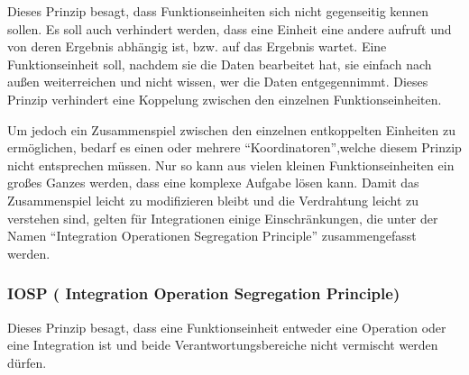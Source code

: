 Dieses Prinzip besagt, dass Funktionseinheiten sich nicht gegenseitig kennen sollen.
Es soll auch verhindert werden, dass eine Einheit eine andere aufruft und von deren Ergebnis
abhängig ist, bzw. auf das Ergebnis wartet.
Eine Funktionseinheit soll, nachdem sie die Daten bearbeitet hat, sie einfach nach
außen weiterreichen und nicht wissen, wer die Daten entgegennimmt.
Dieses Prinzip verhindert eine Koppelung zwischen den einzelnen Funktionseinheiten.

Um jedoch ein Zusammenspiel zwischen den einzelnen entkoppelten Einheiten zu ermöglichen, bedarf es einen oder
mehrere \enquote{Koordinatoren},welche diesem Prinzip nicht entsprechen müssen.
Nur so kann aus vielen kleinen Funktionseinheiten ein großes Ganzes werden, dass eine komplexe Aufgabe lösen kann.
Damit das Zusammenspiel leicht zu modifizieren bleibt und die Verdrahtung
leicht zu verstehen sind, gelten für Integrationen einige Einschränkungen, die
unter der Namen \enquote{Integration Operationen Segregation Principle} zusammengefasst
werden.



\subsubsection{IOSP ( Integration Operation Segregation Principle)}


Dieses Prinzip besagt, dass eine Funktionseinheit entweder eine Operation oder eine Integration ist und beide
Verantwortungsbereiche nicht vermischt werden dürfen.

